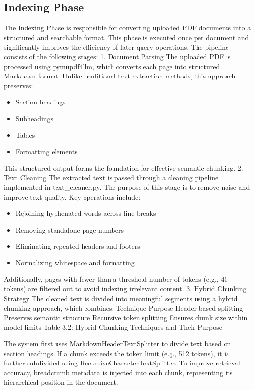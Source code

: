 \documentclass[12pt,a4paper]{report}
\begin{document}
\subsection{Indexing Phase}
The Indexing Phase is responsible for converting uploaded PDF documents into a structured and searchable format. This phase is executed once per document and significantly improves the efficiency of later query operations. The pipeline consists of the following stages:
1. Document Parsing
The uploaded PDF is processed using pymupdf4llm, which converts each page into structured Markdown format. Unlike traditional text extraction methods, this approach preserves:
\begin{itemize}
\item Section headings
\item Subheadings
\item Tables
\item Formatting elements
\end{itemize}
This structured output forms the foundation for effective semantic chunking.
2. Text Cleaning
The extracted text is passed through a cleaning pipeline implemented in text\_cleaner.py. The purpose of this stage is to remove noise and improve text quality. Key operations include:
\begin{itemize}
\item Rejoining hyphenated words across line breaks
\item Removing standalone page numbers
\item Eliminating repeated headers and footers
\item Normalizing whitespace and formatting
\end{itemize}
Additionally, pages with fewer than a threshold number of tokens (e.g., 40 tokens) are filtered out to avoid indexing irrelevant content.
3. Hybrid Chunking Strategy
The cleaned text is divided into meaningful segments using a hybrid chunking approach, which combines:
Technique
Purpose
Header-based splitting
Preserves semantic structure
Recursive token splitting
Ensures chunk size within model limits
Table 3.2: Hybrid Chunking Techniques and Their Purpose


The system first uses MarkdownHeaderTextSplitter to divide text based on section headings. If a chunk exceeds the token limit (e.g., 512 tokens), it is further subdivided using RecursiveCharacterTextSplitter. To improve retrieval accuracy, breadcrumb metadata is injected into each chunk, representing its hierarchical position in the document.
\end{document}
